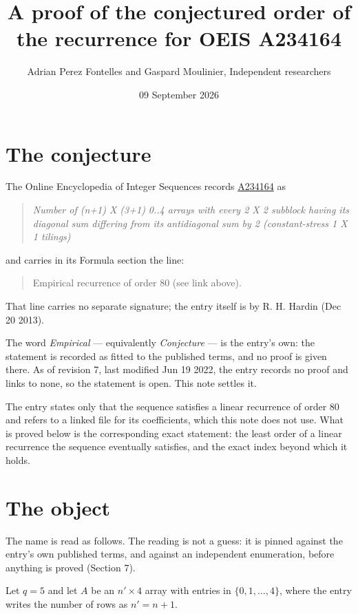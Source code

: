 \documentclass[11pt]{article}
\title{A proof of the conjectured order of the recurrence for OEIS A234164}
\author{Adrian Perez Fontelles and Gaspard Moulinier, Independent researchers}
\date{09 September 2026}
\theoremstyle{definition}
\begin{document}
\maketitle
\section{The conjecture}

The Online Encyclopedia of Integer Sequences records \href{https://oeis.org/A234164}{A234164} as

\begin{quote}\itshape Number of (n+1) X (3+1) 0..4 arrays with every 2 X 2 subblock having its diagonal sum differing from its antidiagonal sum by 2 (constant-stress 1 X 1 tilings)\end{quote}

and carries in its Formula section the line:

\begin{quote}\ttfamily Empirical recurrence of order 80 (see link above).\end{quote}

That line carries no separate signature; the entry itself is by R. H. Hardin (Dec 20 2013).

The word {\itshape Empirical} --- equivalently {\itshape Conjecture} --- is the entry's own: the statement is recorded as fitted to the published terms, and no proof is given there. As of revision 7, last modified Jun 19 2022, the entry records no proof and links to none, so the statement is open. This note settles it.

The entry states only that the sequence satisfies a linear recurrence of order $80$ and refers to a linked file for its coefficients, which this note does not use. What is proved below is the corresponding exact statement: the least order of a linear recurrence the sequence eventually satisfies, and the exact index beyond which it holds.

\section{The object}

The name is read as follows. The reading is not a guess: it is pinned against the entry's own published terms, and against an independent enumeration, before anything is proved (Section 7).

Let $q = 5$ and let $A$ be an $n' \times 4$ array with entries in $\{0,1,\dots,4\}$, where the entry writes the number of rows as $n' = n + 1$.
\end{document}
